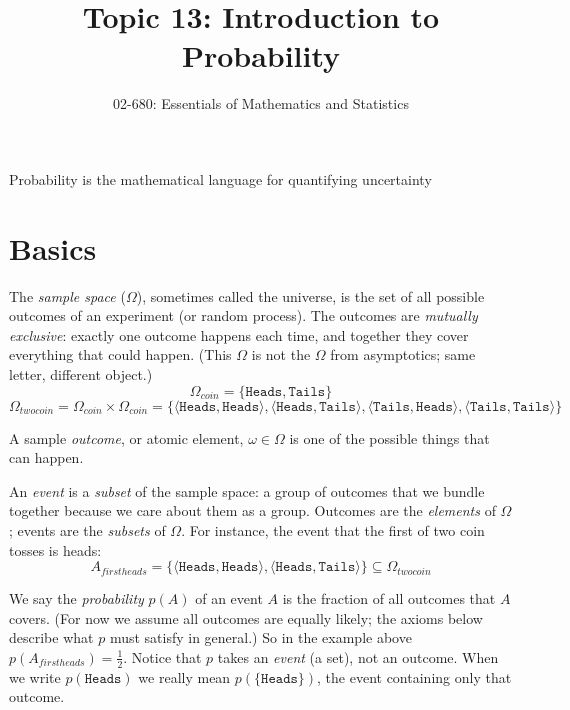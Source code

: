 


\title{Topic 13: Introduction to Probability}
\author{02-680: Essentials of Mathematics and Statistics}


\maketitle

\begin{center}
Probability is the mathematical language for quantifying uncertainty
\end{center} 

\section{Basics}
The \emph{sample space} ($\Omega$), sometimes called the universe, is the set of all possible
outcomes of an experiment (or random process).
The outcomes are \textit{mutually exclusive}: exactly one outcome happens each time,
and together they cover everything that could happen.
(This $\Omega$ is not the $\Omega$ from asymptotics; same letter, different object.)
\[\Omega_{coin}=\{\texttt{Heads},\texttt{Tails}\}\]
\[\Omega_{twocoin}=\Omega_{coin}\times\Omega_{coin}=\{
\langle\texttt{Heads},\texttt{Heads}\rangle,
\langle\texttt{Heads},\texttt{Tails}\rangle,
\langle\texttt{Tails},\texttt{Heads}\rangle,
\langle\texttt{Tails},\texttt{Tails}\rangle\}\]

A sample \emph{outcome}, or atomic element, $\omega\in\Omega$ is one of the possible things that can happen. 

An \emph{event} is a \emph{subset} of the sample space: a group of outcomes that we bundle together because we care about them as a group. 
Outcomes are the \emph{elements} of $\Omega$; events are the \emph{subsets} of $\Omega$. 
For instance, the event that the first of two coin tosses is heads: 
\[A_{firstheads}=\{
\langle\texttt{Heads},\texttt{Heads}\rangle,
\langle\texttt{Heads},\texttt{Tails}\rangle\} \subseteq \Omega_{twocoin} \]

We say the \emph{probability} $p(A)$ of an event $A$ is the fraction of all outcomes that $A$ covers.
(For now we assume all outcomes are equally likely; the axioms below describe what $p$ must satisfy in general.)
So in the example above $p(A_{firstheads})=\frac{1}{2}$.
Notice that $p$ takes an \emph{event} (a set), not an outcome. 
When we write $p(\texttt{Heads})$ we really mean $p(\{\texttt{Heads}\})$, the event containing only that outcome. 

